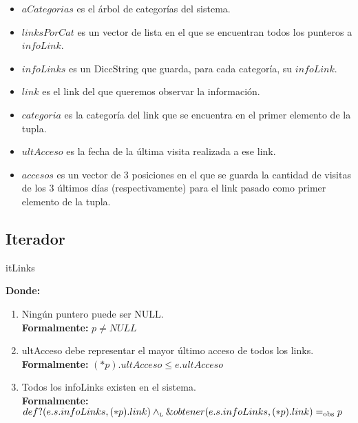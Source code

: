 \documentclass[10pt, a4paper]{article}
\begin{document}
\begin{itemize}
	\item $aCategorias$ es el \'arbol de categor\'ias del sistema.\\
	\item $linksPorCat$ es un vector de lista en el que se encuentran todos los punteros a $infoLink$.\\
	\item $infoLinks$ es un DiccString que guarda, para cada categor\'ia, su $infoLink$.\\
	\item $link$ es el link del que queremos observar la informaci\'on.\\
	\item $categoria$ es la categor\'ia del link que se encuentra en el primer elemento de la tupla.\\
	\item $ultAcceso$ es la fecha de la \'ultima visita realizada a ese link.\\
	\item $accesos$ es un vector de 3 posiciones en el que se guarda la cantidad de visitas de los 3 \'ultimos d\'ias (respectivamente) para el link pasado como primer elemento de la tupla.\\
\end{itemize}

\subsection{Iterador}

\begin{Estructura}{itLinks}
	\begin{Tupla}
	\end{Tupla}
\end{Estructura}

\mbox{}

{\bf Donde:}

\begin{enumerate}
  \item Ning\'un puntero puede ser NULL.\\
		{\bf Formalmente:} $p \neq NULL$

  \item ultAcceso debe representar el mayor \'ultimo acceso de todos los links.\\
		{\bf Formalmente:} $(*p).ultAcceso \leq e.ultAcceso$

  \item Todos los infoLinks existen en el sistema.\\
		{\bf Formalmente:} $def?(e.s.infoLinks, (*p).link) \land_{\mathrm{\scriptscriptstyle{L}}} \&obtener(e.s.infoLinks, (*p).link) =_{\mathrm{obs}} p$
\end{enumerate}
\end{document}
